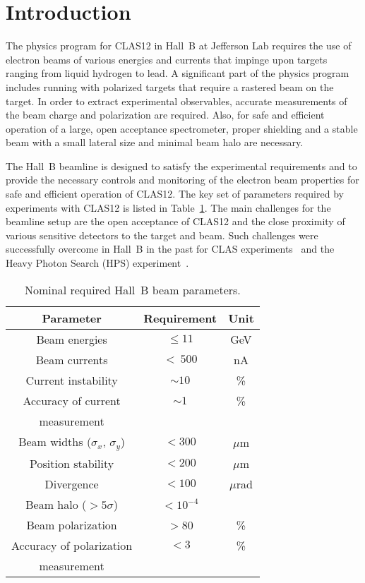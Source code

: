 \section{Introduction}
\label{introduction}

The physics program for CLAS12 in Hall~B at Jefferson Lab requires the use of electron beams of various
energies and currents that impinge upon targets ranging from liquid hydrogen to lead. A significant part of
the physics program includes running with polarized targets that require a rastered beam on the target. In
order to extract experimental observables, accurate measurements of the beam charge and polarization are
required. Also, for safe and efficient operation of a large, open acceptance spectrometer, proper shielding
and a stable beam with a small lateral size and minimal beam halo are necessary. 

The Hall~B beamline is designed to satisfy the experimental requirements and to provide the necessary controls
and monitoring of the electron beam properties for safe and efficient operation of CLAS12. The key set of
parameters required by experiments with CLAS12 is listed in Table~\ref{tab:beam_par}. The main challenges
for the beamline setup are the open acceptance of CLAS12 and the close proximity of various sensitive detectors
to the target and beam. Such challenges were successfully overcome in Hall~B in the past for CLAS
experiments~\cite{CLAS} and the Heavy Photon Search (HPS) experiment~\cite{HPS}.

 \begin{table}[htb]
 \centering
 \begin{tabular}{|c|c|c|}
\hline
Parameter & Requirement &Unit \\ \hline 
Beam energies &  $\le 11$& GeV \\ \hline
Beam currents & $<~500$ & nA \\ \hline
Current instability & $\sim 10$ &\% \\ \hline 
Accuracy of current& $\sim 1$ &\% \\ 
measurement & &\\ \hline 
Beam widths ($\sigma_x $, $\sigma_y$)&$< 300$& $\mu$m \\ \hline 
Position stability &$< 200$ &$\mu$m \\ \hline
Divergence& $< 100$& $\mu$rad \\ \hline 
Beam halo ($> 5\sigma$) &$< 10^{-4}$& \\ \hline
Beam polarization &$>$80 & \%\\ \hline
Accuracy of polarization&$<3$&\% \\ 
measurement&& \\ \hline
\end{tabular}
\caption{Nominal required Hall~B beam parameters.} 
\label{tab:beam_par}
\end{table}

